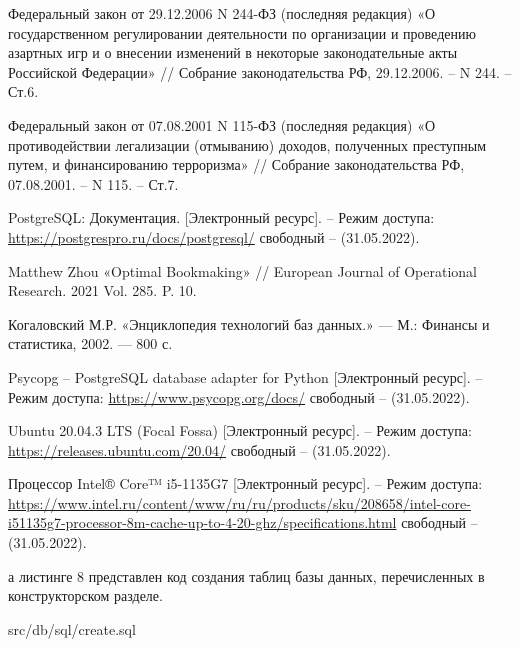 \documentclass[ut8x, 14pt, oneside, a4paper]{extarticle}
\begin{document}
	
	\setmainfont{Times New Roman}
	
	\def\contentsname{СОДЕРЖАНИЕ}
	\tableofcontents
	
	
	
	
	
	
	
	
	
	\renewcommand\bibname{СПИСОК ИСПОЛЬЗОВАННЫХ ИСТОЧНИКОВ}
	\begingroup
	\renewcommand{\anonsection}[2]{}
	\begin{thebibliography}{}
		Федеральный закон от 29.12.2006 N 244-ФЗ (последняя редакция) «О государственном регулировании деятельности по организации и проведению азартных игр и о внесении изменений в некоторые законодательные акты Российской Федерации» // Собрание законодательства РФ,  29.12.2006. – N 244. – Ст.6.
		
		Федеральный закон от 07.08.2001 N 115-ФЗ (последняя редакция) «О противодействии легализации (отмыванию) доходов, полученных преступным путем, и финансированию терроризма» // Собрание законодательства РФ,  07.08.2001. – N 115. – Ст.7.
		
		PostgreSQL: Документация. [Электронный ресурс]. – Режим доступа: 
		\url{https://postgrespro.ru/docs/postgresql/} свободный – (31.05.2022).
		
		Matthew Zhou «Optimal Bookmaking» // European Journal of Operational Research. 2021 Vol. 285. P. 10.
		
		
		Когаловский М.Р. «Энциклопедия технологий баз данных.» — М.: Финансы и статистика, 2002. — 800 с.
		
		Psycopg – PostgreSQL database adapter for Python [Электронный ресурс]. – Режим доступа: 
		\url{https://www.psycopg.org/docs/} свободный – (31.05.2022).
		
		Ubuntu 20.04.3 LTS (Focal Fossa) [Электронный ресурс]. – Режим доступа: 
		\url{https://releases.ubuntu.com/20.04/} свободный – (31.05.2022).
		
		Процессор Intel® Core™ i5-1135G7 [Электронный ресурс]. – Режим доступа: 
		\url{https://www.intel.ru/content/www/ru/ru/products/sku/208658/intel-core-i51135g7-processor-8m-cache-up-to-4-20-ghz/specifications.html} свободный – (31.05.2022).

	\end{thebibliography}
	\endgroup
	\newpage
	\anonsection{ПРИЛОЖЕНИЕ А}
	На листинге 8 представлен код создания таблиц базы данных, перечисленных в конструкторском разделе.
	\FloatBarrier
	\begin{lstinputlisting}[language=SQL, caption=Создание таблиц в БД, 
		basicstyle=\footnotesize\ttfamily, frame=single,breaklines=true]{src/db/sql/create.sql}
	\end{lstinputlisting}
	\FloatBarrier
	
\end{document}
